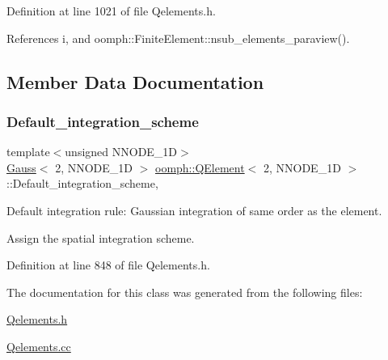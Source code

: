 Definition at line 1021 of file Qelements.\+h.



References i, and oomph\+::\+Finite\+Element\+::nsub\+\_\+elements\+\_\+paraview().



\subsection{Member Data Documentation}
\mbox{\label{classoomph_1_1QElement_3_012_00_01NNODE__1D_01_4_a99c4d04afa691068fcdf8f3a735aaf0a}} 
\subsubsection{\texorpdfstring{Default\+\_\+integration\+\_\+scheme}{Default\_integration\_scheme}}
{\footnotesize\ttfamily template$<$unsigned N\+N\+O\+D\+E\+\_\+1D$>$ \\
\hyperlink{classoomph_1_1Gauss}{Gauss}$<$ 2, N\+N\+O\+D\+E\+\_\+1D $>$ \hyperlink{classoomph_1_1QElement}{oomph\+::\+Q\+Element}$<$ 2, N\+N\+O\+D\+E\+\_\+1D $>$\+::Default\+\_\+integration\+\_\+scheme\hspace{0.3cm}{\ttfamily [static]}, {\ttfamily [private]}}



Default integration rule\+: Gaussian integration of same \textquotesingle{}order\textquotesingle{} as the element. 

Assign the spatial integration scheme. 

Definition at line 848 of file Qelements.\+h.



The documentation for this class was generated from the following files\+:\begin{DoxyCompactItemize}
\item 
\hyperlink{Qelements_8h}{Qelements.\+h}\item 
\hyperlink{Qelements_8cc}{Qelements.\+cc}\end{DoxyCompactItemize}
